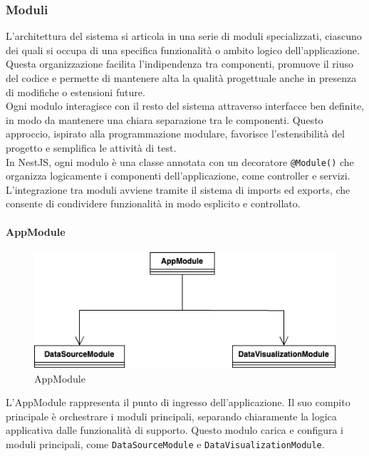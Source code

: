 \subsubsection{Moduli}

L’architettura del sistema si articola in una serie di moduli specializzati, ciascuno dei quali si occupa di una specifica funzionalità o ambito logico dell’applicazione. Questa organizzazione facilita l’indipendenza tra componenti, promuove il riuso del codice e permette di mantenere alta la qualità progettuale anche in presenza di modifiche o estensioni future.\\
Ogni modulo interagisce con il resto del sistema attraverso interfacce ben definite, in modo da mantenere una chiara separazione tra le componenti. Questo approccio, ispirato alla programmazione modulare, favorisce l’estensibilità del progetto e semplifica le attività di test.\\
In NestJS, ogni modulo è una classe annotata con un decoratore \texttt{@Module()} che organizza logicamente i componenti dell’applicazione, come controller e servizi. L’integrazione tra moduli avviene tramite il sistema di imports ed exports, che consente di condividere funzionalità in modo esplicito e controllato.

\paragraph{AppModule}

\begin{figure}[H] 
    \centering
    \includegraphics[scale = 0.6]{template/images/uml_back/AppModule.png}
    \caption{AppModule}
\end{figure}

L'AppModule rappresenta il punto di ingresso dell'applicazione. Il suo compito principale è orchestrare i moduli principali, separando chiaramente la logica applicativa dalle funzionalità di supporto. Questo modulo carica e configura i moduli principali, come \texttt{DataSourceModule} e \texttt{DataVisualizationModule}.

